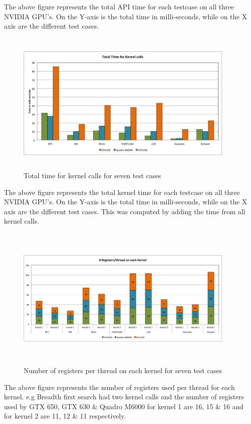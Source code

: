 \documentclass[paper=a4, fontsize=11pt]{scrartcl}
\numberwithin{equation}{section}		%
\numberwithin{figure}{section}			%
\numberwithin{table}{section}				%
\begin{document}
The above figure represents the total API time for each testcase on all three NVIDIA GPU's. On the Y-axis is the total time in milli-seconds, while on the X axis are the different test cases. 

\begin{figure}[!h]
\centering
\includegraphics[width=0.95\textwidth,height=7cm]{../imgs/kernel_calls.png}
\caption{Total time for kernel calls for seven test cases}
\label{fig:totalKERNEL}
\end{figure}

The above figure represents the total kernel time for each testcase on all three NVIDIA GPU's. On the Y-axis is the total time in milli-seconds, while on the X axis are the different test cases. This was computed by adding the time from all kernel calls. 

\begin{figure}[!h]
\centering
\includegraphics[width=0.95\textwidth,height=7cm]{../imgs/register_thread.png}
\caption{Number of registers per thread on each kernel for seven test cases}
\label{fig:regperthread}
\end{figure}

The above figure represents the number of registers used per thread for each kernel. e.g Breadth first search had two kernel calls and the number of registers used by GTX 650, GTX 630 \& Quadro M6000 for kernel 1 are 16, 15 \& 16 and for kernel 2 are 11, 12 \& 11 respectively. 
\end{document}
